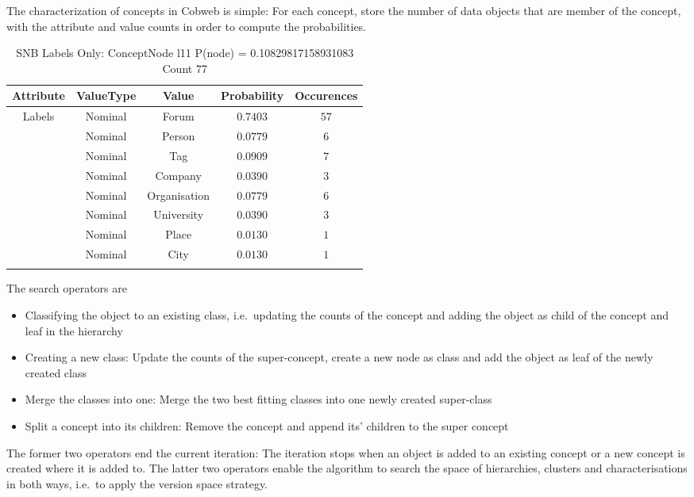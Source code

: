 \noindent The characterization of concepts in Cobweb is simple: For each concept, store the number of data objects that are member of the concept, with the attribute and value counts in order to compute the probabilities. \\
 \begin{table}[htp] 
  \centering 
 \begin{longtable}{|c|c|c|c|c|} \hline 
Attribute & ValueType & Value & Probability & Occurences \\ \hline 
\multirow{8}{*}{Labels} & Nominal & Forum & $0.7403$ & $57$ \\ \cline{2-5} 
 & Nominal & Person & $0.0779$ & $6$ \\ \cline{2-5} 
 & Nominal & Tag & $0.0909$ & $7$ \\ \cline{2-5} 
 & Nominal & Company & $0.0390$ & $3$ \\ \cline{2-5} 
 & Nominal & Organisation & $0.0779$ & $6$ \\ \cline{2-5} 
 & Nominal & University & $0.0390$ & $3$ \\ \cline{2-5} 
 & Nominal & Place & $0.0130$ & $1$ \\ \cline{2-5} 
 & Nominal & City & $0.0130$ & $1$ \\ \hline 
 \caption{SNB Labels Only: ConceptNode l11 \hspace{1cm} P(node) = 0.10829817158931083 \hspace{1cm} Count 77}\label{extab}
\end{longtable}
 \end{table} 

\noindent The search operators are 
\begin{itemize}
    \item Classifying the object to an existing class, i.e.~updating the counts of the concept and adding the object as child of the concept and leaf in the hierarchy
    \item Creating a new class: Update the counts of the super-concept, create a new node as class and add the object as leaf of the newly created class
    \item Merge the classes into one: Merge the two best fitting classes into one newly created super-class
    \item Split a concept into its children: Remove the concept and append its' children to the super concept
\end{itemize}
The former two operators end the current iteration: The iteration stops when an object is added to an existing concept or a new concept is created where it is added to. The latter two operators enable the algorithm to search the space of hierarchies, clusters and characterisations in both ways, i.e.~to apply the version space strategy.

